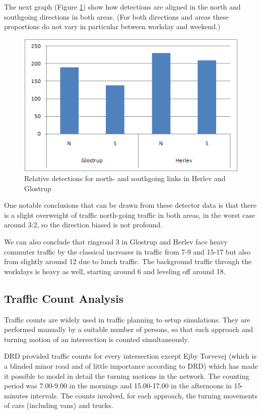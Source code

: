The next graph (Figure \ref{fig:detector_directions}) show how detections are aligned in the north and southgoing directions in both areas. (For both directions and areas these proportions do not vary in particular between workday and weekend.)

\begin{figure}[!ht]
\begin{center}
\includegraphics[scale=0.4]{detector_directions.png} 
\end{center}
\caption{Relative detections for north- and southgoing links in Herlev and Glostrup}
\label{fig:detector_directions}
\end{figure}

One notable conclusions that can be drawn from these detector data is that there is a slight overweight of traffic north-going traffic in both areas, in the worst case around 3:2, so the direction biased is not profound.

We can also conclude that ringroad 3 in Glostrup and Herlev face heavy commuter traffic by the classical increases in traffic from 7-9 and 15-17 but also from slightly around 12 due to lunch traffic. The background traffic through the workdays is heavy as well, starting around 6 and leveling off around 18.

\subsection{Traffic Count Analysis}
\label{traffic_count_analysis}

Traffic counts are widely used in traffic planning to setup simulations. They are performed manually by a suitable number of persons, so that each approach and turning motion of an intersection is counted simultaneously.

DRD provided traffic counts for every intersection except Ejby Torvevej (which is a blinded minor road and of little importance according to DRD) which has made it possible to model in detail the turning motions in the network.
The counting period was 7.00-9.00 in the mornings and 15.00-17.00 in the afternoons in 15-minutes intervals. The counts involved, for each approach, the turning movements of cars (including vans) and trucks. 

